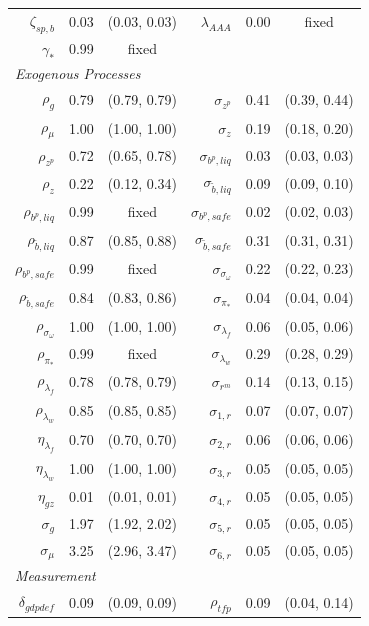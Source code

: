 \documentclass[12pt]{article}
\begin{document}
{\begin{longtable}{rrc@{\hspace{1in}}rrc}
$\zeta_{sp,b}$ & 0.03 & (0.03, 0.03) & $\lambda_{AAA}$ & 0.00 & \scriptsize{fixed} \\
$\gamma_*$ & 0.99 & \scriptsize{fixed} & & & \\[3pt]
\multicolumn{6}{l}{\textit{Exogenous Processes}} \\[3pt]
$\rho_g$ & 0.79 & (0.79, 0.79) & $\sigma_{z^p}$ & 0.41 & (0.39, 0.44) \\
$\rho_{\mu}$ & 1.00 & (1.00, 1.00) & $\sigma_{z}$ & 0.19 & (0.18, 0.20) \\
$\rho_{z^p}$ & 0.72 & (0.65, 0.78) & $\sigma_{b^p, liq}$ & 0.03 & (0.03, 0.03) \\
$\rho_z$ & 0.22 & (0.12, 0.34) & $\sigma_{\tilde{b}, liq}$ & 0.09 & (0.09, 0.10) \\
$\rho_{b^p,liq}$ & 0.99 & \scriptsize{fixed} & $\sigma_{b^p, safe}$ & 0.02 & (0.02, 0.03) \\
$\rho_{\tilde{b},liq}$ & 0.87 & (0.85, 0.88) & $\sigma_{\tilde{b}, safe}$ & 0.31 & (0.31, 0.31) \\
$\rho_{b^p,safe}$ & 0.99 & \scriptsize{fixed} & $\sigma_{\sigma_\omega}$ & 0.22 & (0.22, 0.23) \\
$\rho_{\tilde{b},safe}$ & 0.84 & (0.83, 0.86) & $\sigma_{\pi_*}$ & 0.04 & (0.04, 0.04) \\
$\rho_{\sigma_\omega}$ & 1.00 & (1.00, 1.00) & $\sigma_{\lambda_f}$ & 0.06 & (0.05, 0.06) \\
$\rho_{\pi_*}$ & 0.99 & \scriptsize{fixed} & $\sigma_{\lambda_w}$ & 0.29 & (0.28, 0.29) \\
$\rho_{\lambda_f}$ & 0.78 & (0.78, 0.79) & $\sigma_{r^m}$ & 0.14 & (0.13, 0.15) \\
$\rho_{\lambda_w}$ & 0.85 & (0.85, 0.85) & $\sigma_{1,r}$ & 0.07 & (0.07, 0.07) \\
$\eta_{\lambda_f}$ & 0.70 & (0.70, 0.70) & $\sigma_{2,r}$ & 0.06 & (0.06, 0.06) \\
$\eta_{\lambda_w}$ & 1.00 & (1.00, 1.00) & $\sigma_{3,r}$ & 0.05 & (0.05, 0.05) \\
$\eta_{gz}$ & 0.01 & (0.01, 0.01) & $\sigma_{4,r}$ & 0.05 & (0.05, 0.05) \\
$\sigma_{g}$ & 1.97 & (1.92, 2.02) & $\sigma_{5,r}$ & 0.05 & (0.05, 0.05) \\
$\sigma_{\mu}$ & 3.25 & (2.96, 3.47) & $\sigma_{6,r}$ & 0.05 & (0.05, 0.05) \\[3pt]
\multicolumn{6}{l}{\textit{Measurement}} \\[3pt]
$\delta_{gdpdef}$ & 0.09 & (0.09, 0.09) & $\rho_{tfp}$ & 0.09 & (0.04, 0.14) \\

\end{longtable}}
\end{document}
